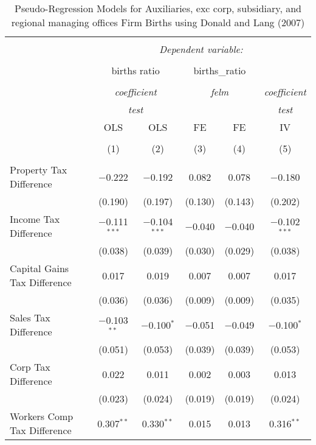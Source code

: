 
\begin{table}[!htbp] \centering 
  \caption{Pseudo-Regression Models for  Auxiliaries, exc corp, subsidiary, and regional managing offices Firm Births using Donald and Lang (2007)} 
  \label{} 
\begin{tabular}{@{\extracolsep{5pt}}lccccc} 
\\[-1.8ex]\hline 
\hline \\[-1.8ex] 
 & \multicolumn{5}{c}{\textit{Dependent variable:}} \\ 
\cline{2-6} 
\\[-1.8ex] & \multicolumn{2}{c}{births ratio} & \multicolumn{2}{c}{births\_ratio} &   \\ 
\\[-1.8ex] & \multicolumn{2}{c}{\textit{coefficient}} & \multicolumn{2}{c}{\textit{felm}} & \textit{coefficient} \\ 
 & \multicolumn{2}{c}{\textit{test}} & \multicolumn{2}{c}{\textit{}} & \textit{test} \\ 
 & OLS & OLS & FE & FE & IV \\ 
\\[-1.8ex] & (1) & (2) & (3) & (4) & (5)\\ 
\hline \\[-1.8ex] 
 Property Tax Difference & $-$0.222 & $-$0.192 & 0.082 & 0.078 & $-$0.180 \\ 
  & (0.190) & (0.197) & (0.130) & (0.143) & (0.202) \\ 
  Income Tax Difference & $-$0.111$^{***}$ & $-$0.104$^{***}$ & $-$0.040 & $-$0.040 & $-$0.102$^{***}$ \\ 
  & (0.038) & (0.039) & (0.030) & (0.029) & (0.038) \\ 
  Capital Gains Tax Difference & 0.017 & 0.019 & 0.007 & 0.007 & 0.017 \\ 
  & (0.036) & (0.036) & (0.009) & (0.009) & (0.035) \\ 
  Sales Tax Difference & $-$0.103$^{**}$ & $-$0.100$^{*}$ & $-$0.051 & $-$0.049 & $-$0.100$^{*}$ \\ 
  & (0.051) & (0.053) & (0.039) & (0.039) & (0.053) \\ 
  Corp Tax Difference & 0.022 & 0.011 & 0.002 & 0.003 & 0.013 \\ 
  & (0.023) & (0.024) & (0.019) & (0.019) & (0.024) \\ 
  Workers Comp Tax Difference & 0.307$^{**}$ & 0.330$^{**}$ & 0.015 & 0.013 & 0.316$^{**}$ \\ 

\end{tabular}
\end{table}
